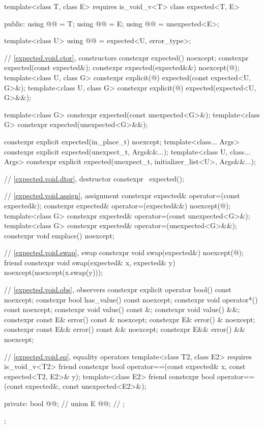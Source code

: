 \begin{codeblock}
template<class T, class E> requires is_void_v<T>
class expected<T, E> {
public:
  using @@ = T;
  using @@ = E;
  using @@ = unexpected<E>;

  template<class U>
  using @@ = expected<U, error_type>;

  // \ref{expected.void.ctor}, constructors
  constexpr expected() noexcept;
  constexpr expected(const expected&);
  constexpr expected(expected&&) noexcept(@\seebelow@);
  template<class U, class G>
    constexpr explicit(@\seebelow@) expected(const expected<U, G>&);
  template<class U, class G>
    constexpr explicit(@\seebelow@) expected(expected<U, G>&&);

  template<class G>
    constexpr expected(const unexpected<G>&);
  template<class G>
    constexpr expected(unexpected<G>&&);

  constexpr explicit expected(in_place_t) noexcept;
  template<class... Args>
    constexpr explicit expected(unexpect_t, Args&&...);
  template<class U, class... Args>
    constexpr explicit expected(unexpect_t, initializer_list<U>, Args&&...);


  // \ref{expected.void.dtor}, destructor
  constexpr ~expected();

  // \ref{expected.void.assign}, assignment
  constexpr expected& operator=(const expected&);
  constexpr expected& operator=(expected&&) noexcept(@\seebelow@);
  template<class G>
    constexpr expected& operator=(const unexpected<G>&);
  template<class G>
    constexpr expected& operator=(unexpected<G>&&);
  constexpr void emplace() noexcept;

  // \ref{expected.void.swap}, swap
  constexpr void swap(expected&) noexcept(@\seebelow@);
  friend constexpr void swap(expected& x, expected& y) noexcept(noexcept(x.swap(y)));

  // \ref{expected.void.obs}, observers
  constexpr explicit operator bool() const noexcept;
  constexpr bool has_value() const noexcept;
  constexpr void operator*() const noexcept;
  constexpr void value() const &;
  constexpr void value() &&;
  constexpr const E& error() const & noexcept;
  constexpr E& error() & noexcept;
  constexpr const E&& error() const && noexcept;
  constexpr E&& error() && noexcept;

  // \ref{expected.void.eq}, equality operators
  template<class T2, class E2> requires is_void_v<T2>
    friend constexpr bool operator==(const expected& x, const expected<T2, E2>& y);
  template<class E2>
    friend constexpr bool operator==(const expected&, const unexpected<E2>&);

private:
  bool @@;         // \expos
  union {
    E @@;             // \expos
  };
};
\end{codeblock}

